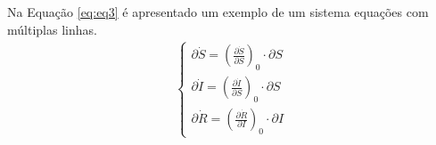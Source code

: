 Na Equação \ref{eq:eq3} é apresentado um exemplo de um sistema equações com múltiplas linhas.
\begin{equation}
\label{eq:eq3}
    \begin{split}
        \begin{cases}
            \partial \Dot{S} =  \left( \frac{\partial \Dot{S} } {\partial S} \right)_0 \cdot \partial S \\
            \partial \Dot{I} = \left( \frac{\partial \Dot{I} } {\partial S} \right)_0 \cdot \partial S \\
            \partial \Dot{R} = \left( \frac{\partial \Dot{R} } {\partial I} \right)_0 \cdot \partial I
        \end{cases}
    \end{split}
\end{equation}


